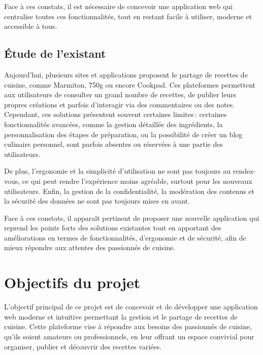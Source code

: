 \documentclass[12pt,a4paper]{report}
\begin{document}
Face à ces constats, il est nécessaire de concevoir une application web qui centralise toutes ces fonctionnalités, tout en restant facile à utiliser, moderne et accessible à tous.
\subsection{Étude de l'existant}

Aujourd’hui, plusieurs sites et applications proposent le partage de recettes de cuisine, comme Marmiton, 750g ou encore Cookpad. Ces plateformes permettent aux utilisateurs de consulter un grand nombre de recettes, de publier leurs propres créations et parfois d’interagir via des commentaires ou des notes. Cependant, ces solutions présentent souvent certaines limites : certaines fonctionnalités avancées, comme la gestion détaillée des ingrédients, la personnalisation des étapes de préparation, ou la possibilité de créer un blog culinaire personnel, sont parfois absentes ou réservées à une partie des utilisateurs.

De plus, l’ergonomie et la simplicité d’utilisation ne sont pas toujours au rendez-vous, ce qui peut rendre l’expérience moins agréable, surtout pour les nouveaux utilisateurs. Enfin, la gestion de la confidentialité, la modération des contenus et la sécurité des données ne sont pas toujours mises en avant.

Face à ces constats, il apparaît pertinent de proposer une nouvelle application qui reprend les points forts des solutions existantes tout en apportant des améliorations en termes de fonctionnalités, d’ergonomie et de sécurité, afin de mieux répondre aux attentes des passionnés de cuisine.
\section{Objectifs du projet}

L’objectif principal de ce projet est de concevoir et de développer une application web moderne et intuitive permettant la gestion et le partage de recettes de cuisine. Cette plateforme vise à répondre aux besoins des passionnés de cuisine, qu’ils soient amateurs ou professionnels, en leur offrant un espace convivial pour organiser, publier et découvrir des recettes variées.
\end{document}
